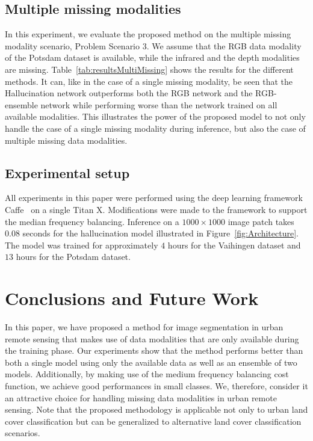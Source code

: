 \documentclass[journal]{IEEEtran}
\begin{document}
\subsection{Multiple missing modalities}
\label{sec:missing_experiments}
In this experiment, we evaluate the proposed method on the multiple missing modality scenario, Problem Scenario 3. We assume that the RGB data modality of the Potsdam dataset is available, while the infrared and the depth modalities are missing. Table~\ref{tab:resultsMultiMissing} shows the results for the different methods. It can, like in the case of a single missing modality, be seen that the Hallucination network outperforms both the RGB network and the RGB-ensemble network while performing worse than the network trained on all available modalities. This illustrates the power of the proposed model to not only handle the case of a single missing modality during inference, but also the case of multiple missing data modalities.

\subsection{Experimental setup}
All experiments in this paper were performed using the deep learning framework Caffe~\cite{jia2014caffe} on a single Titan X. Modifications were made to the framework to support the median frequency balancing. Inference on a $1000 \times 1000$ image patch takes 0.08 seconds for the hallucination model illustrated in Figure~\ref{fig:Architecture}. The model was trained for approximately $4$ hours for the Vaihingen dataset and $13$ hours for the Potsdam dataset.
\section{Conclusions and Future Work}
\label{sec:conclusion}
In this paper, we have proposed a method for image segmentation in urban remote sensing that makes use of data modalities that are only available during the training phase. Our experiments show that the method performs better than both a single model using only the available data as well as an ensemble of two models. Additionally, by making use of the medium frequency balancing cost function, we achieve good performances in small classes. We, therefore, consider it an attractive choice for handling missing data modalities in urban remote sensing.
Note that the proposed methodology is applicable not only to urban land cover classification but can be generalized to alternative land cover classification scenarios.
\end{document}
